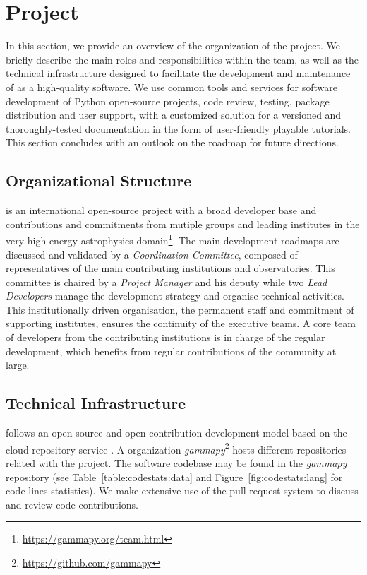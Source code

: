 \documentclass[traditabstract, longauth]{aa}
\begin{document}
\section{\gammapy Project} \label{sec:gammapy-project}

In this section, we provide an overview of the organization of the \gammapy
project. We briefly describe the main roles and responsibilities within the
team, as well as the technical infrastructure designed to facilitate the
development and maintenance of \gammapy as a high-quality software. We use
common tools and services for software development of Python open-source
projects, code review, testing, package distribution and user support, with a
customized solution for a versioned and thoroughly-tested documentation in the form
of user-friendly playable tutorials. This section concludes with an outlook on
the roadmap for future directions.

\subsection{Organizational Structure}
\label{ssec:organizational-structure}

\gammapy is an international open-source project with a broad
developer base and contributions and commitments from mutiple groups and
leading institutes in the very high-energy astrophysics
domain\footnote{\url{https://gammapy.org/team.html}}. The main development
roadmaps are discussed and validated by a \textit{Coordination Committee}, composed of
representatives of the main contributing institutions and observatories.
This committee is
chaired by a \textit{Project Manager} and his deputy while two \textit{Lead Developers} manage
the development strategy and organise technical activities. This
institutionally driven organisation, the permanent staff and commitment of
supporting institutes, ensures the continuity of the executive teams. A core team
of developers from the contributing institutions is in charge of the regular
development, which benefits from regular contributions of the community at
large.

\subsection{Technical Infrastructure}
\label{ssec:technical-infrastructure}

\gammapy follows an open-source and open-contribution development model based on
the cloud repository service \github. A \github organization
\textit{gammapy}\footnote{\url{https://github.com/gammapy}} hosts different
repositories related with the project. The software codebase may be found in
the \textit{gammapy} repository (see Table~\ref{table:codestats:data} and
Figure~\ref{fig:codestats:lang} for code lines statistics). We make extensive
use of the pull request system to discuss and review code contributions.
\end{document}
